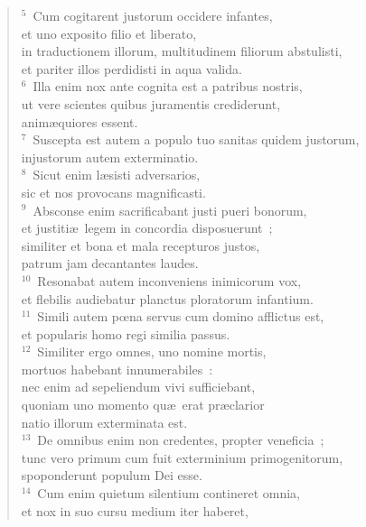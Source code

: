 \begin{verse}${}^{5}$~Cum cogitarent justorum occidere infantes,\\ et uno exposito filio et liberato,\\ in traductionem illorum, multitudinem filiorum abstulisti,\\ et pariter illos perdidisti in aqua valida.\\
${}^{6}$~Illa enim nox ante cognita est a patribus nostris,\\ ut vere scientes quibus juramentis crediderunt,\\ anim\ae quiores essent.\\
${}^{7}$~Suscepta est autem a populo tuo sanitas quidem justorum,\\ injustorum autem exterminatio.\\
${}^{8}$~Sicut enim l\ae sisti adversarios,\\ sic et nos provocans magnificasti.\\
${}^{9}$~Absconse enim sacrificabant justi pueri bonorum,\\ et justiti\ae\ legem in concordia disposuerunt~;\\ similiter et bona et mala recepturos justos,\\ patrum jam decantantes laudes.\\
${}^{10}$~Resonabat autem inconveniens inimicorum vox,\\ et flebilis audiebatur planctus ploratorum infantium.\\
${}^{11}$~Simili autem pœna servus cum domino afflictus est,\\ et popularis homo regi similia passus.\\
${}^{12}$~Similiter ergo omnes, uno nomine mortis,\\ mortuos habebant innumerabiles~:\\ nec enim ad sepeliendum vivi sufficiebant,\\ quoniam uno momento qu\ae\ erat pr\ae clarior\\ natio illorum exterminata est.\\
${}^{13}$~De omnibus enim non credentes, propter veneficia~;\\ tunc vero primum cum fuit exterminium primogenitorum,\\ spoponderunt populum Dei esse.\\
${}^{14}$~Cum enim quietum silentium contineret omnia,\\ et nox in suo cursu medium iter haberet,\\

\end{verse}
